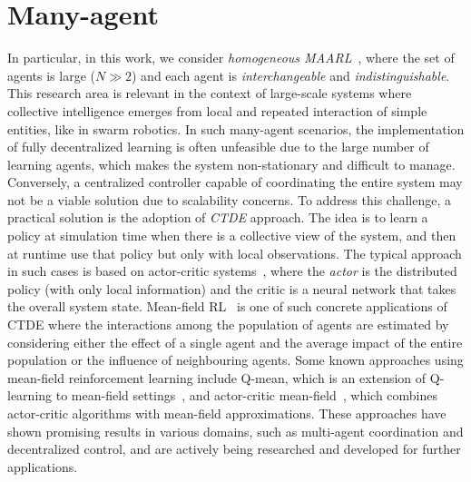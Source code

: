 \section{Many-agent}
In particular, in this work, we consider \emph{homogeneous \ac{MAARL}}~\cite{yang2021many}, 
 where the set of agents is large ($N \gg 2$) and each agent is \emph{interchangeable} and \emph{indistinguishable}.
%
This research area is relevant in the context of large-scale systems 
 where collective intelligence emerges from local and repeated interaction of simple entities, like in swarm robotics.
%
In such many-agent scenarios, 
 the implementation of fully decentralized learning is often unfeasible due to the large number of learning agents, 
 which makes the system non-stationary and difficult to manage. 
%
Conversely, a centralized controller capable of coordinating 
 the entire system may not be a viable solution due to scalability concerns. 
 To address this challenge, a practical solution is the adoption of \emph{\ac{CTDE}} approach.
%
The idea is to learn a policy at simulation time when there is a collective view of the system, 
 and then at runtime use that policy but only with local observations. 
%
The typical approach in such cases is based on actor-critic systems~\cite{DBLP:conf/nips/LoweWTHAM17,wu2022more,song2022ctds,song2022centralized},
  where the \emph{actor} is the distributed policy (with only local information) and the critic is a neural network that takes the overall system state.
%
Mean-field RL~\cite{pmlr-v80-yang18d} is one of such concrete applications of \ac{CTDE} 
 where the interactions among the population of agents are estimated by considering either the effect of a single agent and the average impact of the entire population or the influence of neighbouring agents.
%
Some known approaches using mean-field reinforcement learning include Q-mean, 
 which is an extension of Q-learning to mean-field settings~\cite{yang2018mean}, 
 and actor-critic mean-field~\cite{frikha2023actor}, which combines actor-critic algorithms with mean-field approximations. 
%
These approaches have shown promising results in various domains, such as multi-agent coordination 
 and decentralized control, and are actively being researched and developed for further applications.
